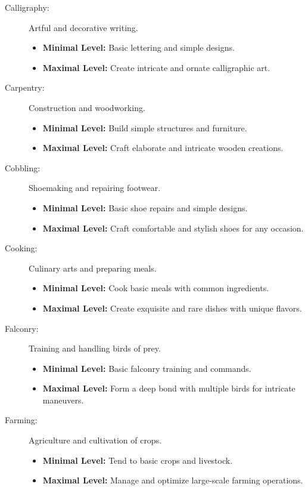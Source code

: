 \begin{description}
    \item[Calligraphy:] Artful and decorative writing.
        \begin{itemize}
            \item \textbf{Minimal Level:} Basic lettering and simple designs.
            \item \textbf{Maximal Level:} Create intricate and ornate calligraphic art.
        \end{itemize}

    \item[Carpentry:] Construction and woodworking.
        \begin{itemize}
            \item \textbf{Minimal Level:} Build simple structures and furniture.
            \item \textbf{Maximal Level:} Craft elaborate and intricate wooden creations.
        \end{itemize}

    \item[Cobbling:] Shoemaking and repairing footwear.
        \begin{itemize}
            \item \textbf{Minimal Level:} Basic shoe repairs and simple designs.
            \item \textbf{Maximal Level:} Craft comfortable and stylish shoes for any occasion.
        \end{itemize}

    \item[Cooking:] Culinary arts and preparing meals.
        \begin{itemize}
            \item \textbf{Minimal Level:} Cook basic meals with common ingredients.
            \item \textbf{Maximal Level:} Create exquisite and rare dishes with unique flavors.
        \end{itemize}

    \item[Falconry:] Training and handling birds of prey.
        \begin{itemize}
            \item \textbf{Minimal Level:} Basic falconry training and commands.
            \item \textbf{Maximal Level:} Form a deep bond with multiple birds for intricate maneuvers.
        \end{itemize}

    \item[Farming:] Agriculture and cultivation of crops.
        \begin{itemize}
            \item \textbf{Minimal Level:} Tend to basic crops and livestock.
            \item \textbf{Maximal Level:} Manage and optimize large-scale farming operations.
        \end{itemize}


\end{description}
